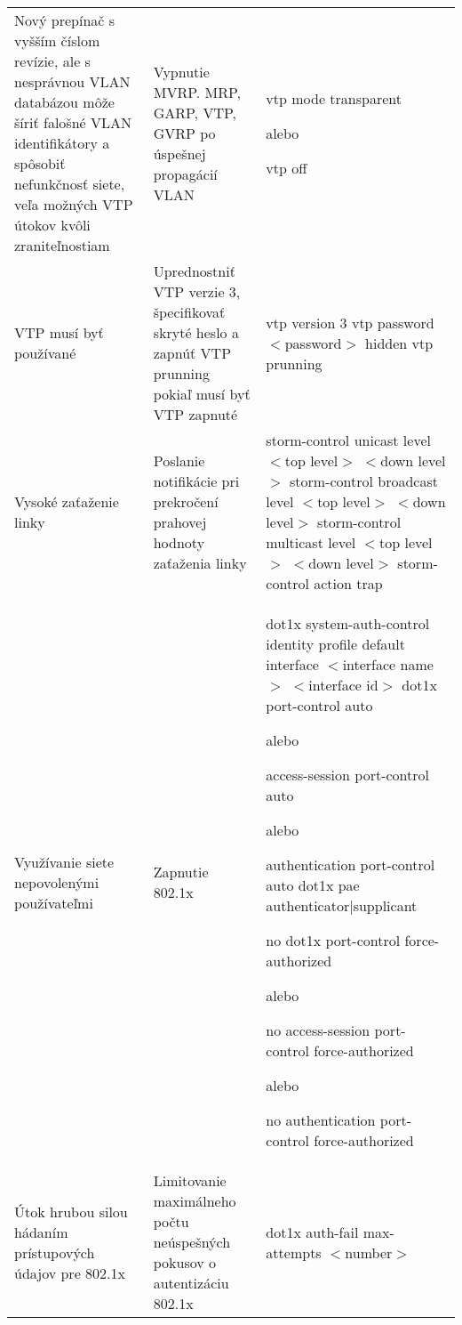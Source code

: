 \begin{longtable}[!htbp]{|L{10em}L{10em}L{34em}|}
	
	
	
	 Nový prepínač s vyšším číslom revízie, ale s nesprávnou VLAN databázou môže šíriť falošné VLAN identifikátory a spôsobiť nefunkčnosť siete, veľa možných VTP útokov kvôli zraniteľnostiam 	&Vypnutie MVRP. MRP, GARP, VTP, GVRP po úspešnej propagácií VLAN	&vtp mode transparent
	
	alebo
	
	vtp off\\
	
	
	
	
	VTP musí byť používané	&Uprednostniť VTP verzie 3, špecifikovať skryté heslo a zapnúť VTP prunning pokiaľ musí byť VTP zapnuté	&vtp version 3
	vtp password $<$password$>$ hidden
	vtp prunning\\
	
	
	
	
	 Vysoké zaťaženie linky	&Poslanie notifikácie pri prekročení prahovej hodnoty zaťaženia linky	&storm-control unicast level $<$top level$>$ $<$down level$>$
	storm-control broadcast level $<$top level$>$ $<$down level$>$
	storm-control multicast level $<$top level$>$ $<$down level$>$
	storm-control action trap\\
	
	
	
	
	Využívanie siete nepovolenými používateľmi	&Zapnutie 802.1x 	&dot1x system-auth-control
	identity profile default
	interface $<$interface name$>$ $<$interface id$>$
	dot1x port-control auto
	
	alebo
	
	access-session port-control auto
	
	alebo
	
	authentication port-control auto
	dot1x pae authenticator|supplicant 
	
	no dot1x port-control force-authorized
	
	alebo
	
	no access-session port-control force-authorized
	
	alebo
	
	no authentication port-control force-authorized\\
	
	
	
	 Útok hrubou silou hádaním prístupových údajov pre 802.1x 	&Limitovanie maximálneho počtu neúspešných pokusov o autentizáciu 802.1x	&dot1x auth-fail max-attempts $<$number$>$\\
	

\end{longtable}
